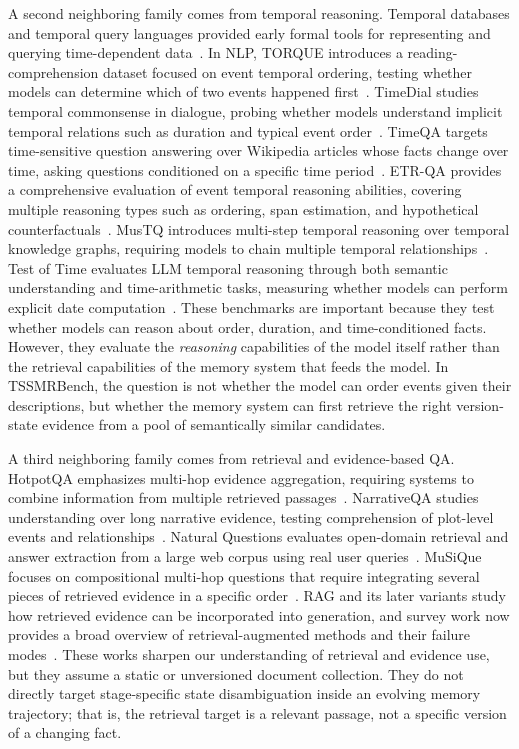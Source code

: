 A second neighboring family comes from temporal reasoning. Temporal databases and temporal query languages provided early formal tools for representing and querying time-dependent data~\cite{jensen1999temporal,snodgrass1995tsql2}. In NLP, TORQUE introduces a reading-comprehension dataset focused on event temporal ordering, testing whether models can determine which of two events happened first~\cite{ning2020torque}. TimeDial studies temporal commonsense in dialogue, probing whether models understand implicit temporal relations such as duration and typical event order~\cite{qin2021timedial}. TimeQA targets time-sensitive question answering over Wikipedia articles whose facts change over time, asking questions conditioned on a specific time period~\cite{timeqa2021}. ETR-QA provides a comprehensive evaluation of event temporal reasoning abilities, covering multiple reasoning types such as ordering, span estimation, and hypothetical counterfactuals~\cite{luo2025etrqa}. MusTQ introduces multi-step temporal reasoning over temporal knowledge graphs, requiring models to chain multiple temporal relationships~\cite{mustq2024}. Test of Time evaluates LLM temporal reasoning through both semantic understanding and time-arithmetic tasks, measuring whether models can perform explicit date computation~\cite{fatemi2024testoftime,time2025}. These benchmarks are important because they test whether models can reason about order, duration, and time-conditioned facts. However, they evaluate the \emph{reasoning} capabilities of the model itself rather than the retrieval capabilities of the memory system that feeds the model. In TSSMRBench, the question is not whether the model can order events given their descriptions, but whether the memory system can first retrieve the right version-state evidence from a pool of semantically similar candidates.

A third neighboring family comes from retrieval and evidence-based QA. HotpotQA emphasizes multi-hop evidence aggregation, requiring systems to combine information from multiple retrieved passages~\cite{yang2018hotpotqa}. NarrativeQA studies understanding over long narrative evidence, testing comprehension of plot-level events and relationships~\cite{kocisky2018narrativeqa}. Natural Questions evaluates open-domain retrieval and answer extraction from a large web corpus using real user queries~\cite{kwiatkowski2019naturalquestions}. MuSiQue focuses on compositional multi-hop questions that require integrating several pieces of retrieved evidence in a specific order~\cite{trivedi2022musique}. RAG and its later variants study how retrieved evidence can be incorporated into generation, and survey work now provides a broad overview of retrieval-augmented methods and their failure modes~\cite{gao2023rag,lewis2020rag}. These works sharpen our understanding of retrieval and evidence use, but they assume a static or unversioned document collection. They do not directly target stage-specific state disambiguation inside an evolving memory trajectory; that is, the retrieval target is a relevant passage, not a specific version of a changing fact.

